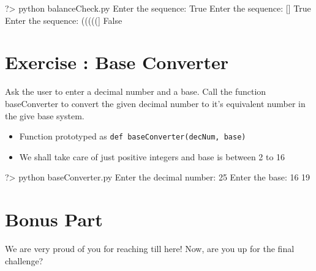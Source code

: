 \documentclass{42-en}
\begin{document}
		\begin{42console}
			?> python balanceCheck.py
			Enter the sequence:   
			True
			Enter the sequence: [{}]
			True
			Enter the sequence: (((((]
			False
		\end{42console}


\chapter{Exercise \exercicenumber: Base Converter}

\exnumber{\exercicenumber}

\makeheaderfiles

Ask the user to enter a decimal number and a base. Call the function baseConverter to convert the given decimal number to it's equivalent number in the give base system.

		\begin{itemize}\itemsep1pt
			\item Function prototyped as \texttt{def baseConverter(decNum, base)}
			\item We shall take care of just positive integers and base is between 2 to 16
        	\end{itemize}
	
		\begin{42console}
			?> python baseConverter.py
			Enter the decimal number: 25
			Enter the base: 16
			19
		\end{42console}





\chapter{Bonus Part}
	We are very proud of you for reaching till here! Now, are you up for the final challenge?\\

\exnumber{\exercicenumber}
\end{document}
